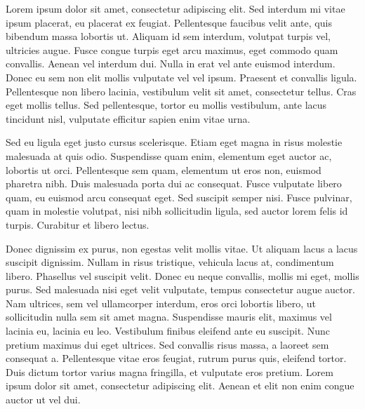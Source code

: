 Lorem ipsum dolor sit amet, consectetur adipiscing elit. Sed interdum mi vitae ipsum placerat, eu placerat ex feugiat. Pellentesque faucibus velit ante, quis bibendum massa lobortis ut. Aliquam id sem interdum, volutpat turpis vel, ultricies augue. Fusce congue turpis eget arcu maximus, eget commodo quam convallis. Aenean vel interdum dui. Nulla in erat vel ante euismod interdum. Donec eu sem non elit mollis vulputate vel vel ipsum. Praesent et convallis ligula. Pellentesque non libero lacinia, vestibulum velit sit amet, consectetur tellus. Cras eget mollis tellus. Sed pellentesque, tortor eu mollis vestibulum, ante lacus tincidunt nisl, vulputate efficitur sapien enim vitae urna.

Sed eu ligula eget justo cursus scelerisque. Etiam eget magna in risus molestie malesuada at quis odio. Suspendisse quam enim, elementum eget auctor ac, lobortis ut orci. Pellentesque sem quam, elementum ut eros non, euismod pharetra nibh. Duis malesuada porta dui ac consequat. Fusce vulputate libero quam, eu euismod arcu consequat eget. Sed suscipit semper nisi. Fusce pulvinar, quam in molestie volutpat, nisi nibh sollicitudin ligula, sed auctor lorem felis id turpis. Curabitur et libero lectus.

Donec dignissim ex purus, non egestas velit mollis vitae. Ut aliquam lacus a lacus suscipit dignissim. Nullam in risus tristique, vehicula lacus at, condimentum libero. Phasellus vel suscipit velit. Donec eu neque convallis, mollis mi eget, mollis purus. Sed malesuada nisi eget velit vulputate, tempus consectetur augue auctor. Nam ultrices, sem vel ullamcorper interdum, eros orci lobortis libero, ut sollicitudin nulla sem sit amet magna. Suspendisse mauris elit, maximus vel lacinia eu, lacinia eu leo. Vestibulum finibus eleifend ante eu suscipit. Nunc pretium maximus dui eget ultrices. Sed convallis risus massa, a laoreet sem consequat a. Pellentesque vitae eros feugiat, rutrum purus quis, eleifend tortor. Duis dictum tortor varius magna fringilla, et vulputate eros pretium. Lorem ipsum dolor sit amet, consectetur adipiscing elit. Aenean et elit non enim congue auctor ut vel dui.